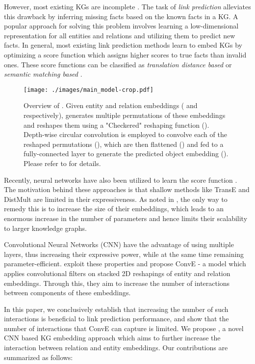 \documentclass[11pt,a4paper]{article}
\begin{document}
However, most existing KGs are incomplete \cite{kg_incomp1}. The task of \textit{link prediction} alleviates this drawback by inferring missing facts based on the known facts in a KG. A popular approach for solving this problem involves learning a low-dimensional representation for all entities and relations and utilizing them to predict new facts. In general, most existing link prediction methods learn to embed KGs by optimizing a score function which assigns higher scores to true facts than invalid ones. These score functions can be classified as \textit{translation distance based} \cite{transe,transg,transh} or \textit{semantic matching  based} \cite{hole,analogy}.

\begin{figure*}[t]
	\centering
	\texttt{[image: ./images/main\_model-crop.pdf]}
	\caption{\label{fig:model_overview} Overview of \method{}. Given entity and relation embeddings ( and  respectively), \method{} generates multiple permutations of these embeddings and reshapes them using a "Checkered" reshaping function (). Depth-wise circular convolution is employed to convolve each of the reshaped permutations (), which are then flattened () and fed to a fully-connected layer to generate the predicted object embedding (). Please refer to  for details.}
\end{figure*}


Recently, neural networks have also been utilized to learn the score function \cite{neural_tensor_network,chandrahas2017,conve}. The motivation behind these approaches is that shallow methods like TransE \cite{transe} and DistMult \cite{distmult} are limited in their expressiveness. As noted in \citet{conve}, the only way to remedy this is to increase the size of their embeddings, which leads to an enormous increase in the number of parameters and hence limits their scalability to larger knowledge graphs.

Convolutional Neural Networks (CNN) have the advantage of using multiple layers, thus increasing their expressive power, while at the same time remaining parameter-efficient. \citet{conve} exploit these properties and propose ConvE - a model which applies convolutional filters on stacked 2D reshapings of entity and relation embeddings. Through this, they aim to increase the number of interactions between components of these embeddings.

In this paper, we conclusively establish that increasing the number of such interactions is beneficial to link prediction performance, and show that the number of interactions that ConvE can capture is limited. We propose \method{}, a novel CNN based KG embedding approach which aims to further increase the interaction between relation and entity embeddings.
Our contributions are summarized as follows: 
\end{document}
